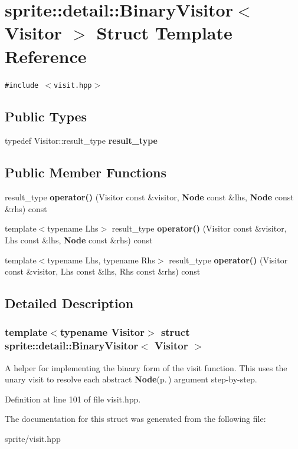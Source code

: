 \section{sprite::detail::Binary\-Visitor$<$ Visitor $>$ Struct Template Reference}
\label{structsprite_1_1detail_1_1BinaryVisitor}
{\tt \#include $<$visit.hpp$>$}

\subsection*{Public Types}
\begin{CompactItemize}
\item 
typedef Visitor::result\_\-type {\bf result\_\-type}\label{structsprite_1_1detail_1_1BinaryVisitor_w0}

\end{CompactItemize}
\subsection*{Public Member Functions}
\begin{CompactItemize}
\item 
result\_\-type {\bf operator()} (Visitor const \&visitor, {\bf Node} const \&lhs, {\bf Node} const \&rhs) const \label{structsprite_1_1detail_1_1BinaryVisitor_a0}

\item 
template$<$typename Lhs$>$ result\_\-type {\bf operator()} (Visitor const \&visitor, Lhs const \&lhs, {\bf Node} const \&rhs) const \label{structsprite_1_1detail_1_1BinaryVisitor_a1}

\item 
template$<$typename Lhs, typename Rhs$>$ result\_\-type {\bf operator()} (Visitor const \&visitor, Lhs const \&lhs, Rhs const \&rhs) const \label{structsprite_1_1detail_1_1BinaryVisitor_a2}

\end{CompactItemize}


\subsection{Detailed Description}
\subsubsection*{template$<$typename Visitor$>$ struct sprite::detail::Binary\-Visitor$<$ Visitor $>$}

A helper for implementing the binary form of the visit function. This uses the unary visit to resolve each abstract {\bf Node}{\rm (p.\,\pageref{structsprite_1_1Node})} argument step-by-step. 



Definition at line 101 of file visit.hpp.

The documentation for this struct was generated from the following file:\begin{CompactItemize}
\item 
sprite/visit.hpp\end{CompactItemize}
